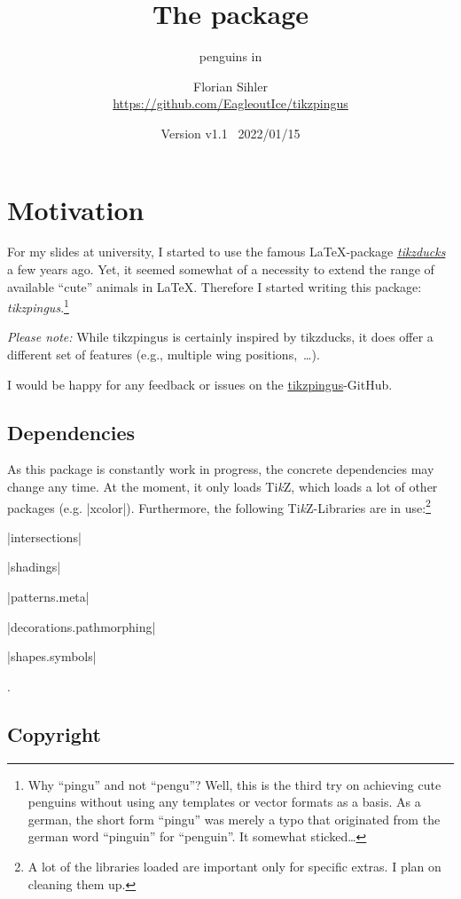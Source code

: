 \documentclass[parskip=half,english,numbers=noenddot,footnotes=nomultiple,oneside]{scrartcl}
\title{The \texorpdfstring{\tikzpingus}{tikzpingus} package}
\subtitle{penguins in \TikZ}
\author{%
	\texorpdfstring{Florian Sihler\\[.4em]
		\url{https://github.com/EagleoutIce/tikzpingus}
	}{Florian Sihler}}
\date{Version v1.1 \textendash\ 2022/01/15}
\let\say\enquote
\def\TikZ{Ti\textit{k}Z}
\begin{document}
{\let\newpage\relax\maketitle} %

\section{Motivation}

For my slides at university, I started to use the famous \LaTeX-package \textsl{\href{https://github.com/samcarter/tikzducks}{tikzducks}} a few years ago.
Yet, it seemed somewhat of a necessity to extend the range of available \say{cute} animals in \LaTeX.
Therefore I started writing this package: \textsl{tikzpingus}.\footnote{Why \say{pingu} and not \say{pengu}? Well, this is the third try on achieving cute penguins without using any templates or vector formats as a basis. As a german, the short form \say{pingu} was merely a typo that originated from the german word \say{pinguin} for \say{penguin}. It somewhat sticked\ldots}

\textit{Please note:} While tikzpingus is certainly inspired by tikzducks, it does offer a different set of features (e.g., multiple wing positions,~\ldots).

I would be happy for any feedback or issues on the \href{https://github.com/EagleoutIce/tikzpingus}{tikzpingus}-GitHub.

\subsection{Dependencies}

As this package is constantly work in progress, the concrete dependencies may change any time.
At the moment, it only loads \TikZ, which loads a lot of other packages (e.g. |xcolor|).
Furthermore, the following \TikZ-Libraries are in use:\footnote{A lot of the libraries loaded are important only for specific extras. I plan on cleaning them up.}
\begin{inlist}
	\item |intersections|
	\item |shadings|
	\item |patterns.meta|
	\item |decorations.pathmorphing|
	\item |shapes.symbols|
\end{inlist}.

\subsection{Copyright}
\end{document}
